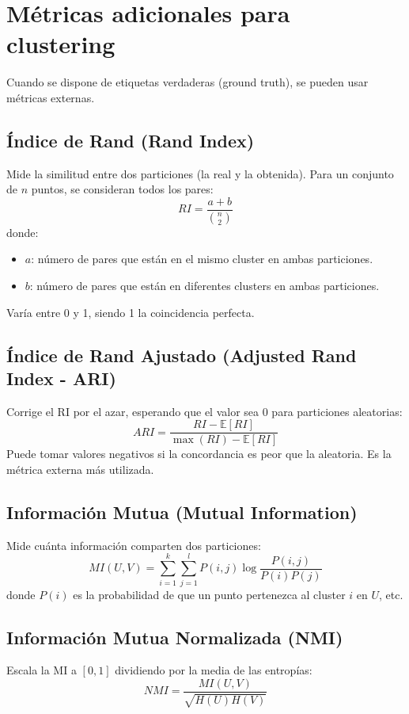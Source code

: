 \documentclass[12pt,a4paper,openany,oneside]{book}
\begin{document}
\section{Métricas adicionales para clustering}

Cuando se dispone de etiquetas verdaderas (ground truth), se pueden usar métricas externas.

\subsection{Índice de Rand (Rand Index)}
Mide la similitud entre dos particiones (la real y la obtenida). Para un conjunto de \(n\) puntos, se consideran todos los pares:
\[
RI = \frac{a + b}{\binom{n}{2}}
\]
donde:
\begin{itemize}
    \item \(a\): número de pares que están en el mismo cluster en ambas particiones.
    \item \(b\): número de pares que están en diferentes clusters en ambas particiones.
\end{itemize}
Varía entre 0 y 1, siendo 1 la coincidencia perfecta.

\subsection{Índice de Rand Ajustado (Adjusted Rand Index - ARI)}
Corrige el RI por el azar, esperando que el valor sea 0 para particiones aleatorias:
\[
ARI = \frac{RI - \mathbb{E}[RI]}{\max(RI) - \mathbb{E}[RI]}
\]
Puede tomar valores negativos si la concordancia es peor que la aleatoria. Es la métrica externa más utilizada.

\subsection{Información Mutua (Mutual Information)}
Mide cuánta información comparten dos particiones:
\[
MI(U,V) = \sum_{i=1}^k \sum_{j=1}^l P(i,j) \log \frac{P(i,j)}{P(i)P(j)}
\]
donde \(P(i)\) es la probabilidad de que un punto pertenezca al cluster \(i\) en \(U\), etc.

\subsection{Información Mutua Normalizada (NMI)}
Escala la MI a \([0,1]\) dividiendo por la media de las entropías:
\[
NMI = \frac{MI(U,V)}{\sqrt{H(U)H(V)}}
\]
\end{document}
